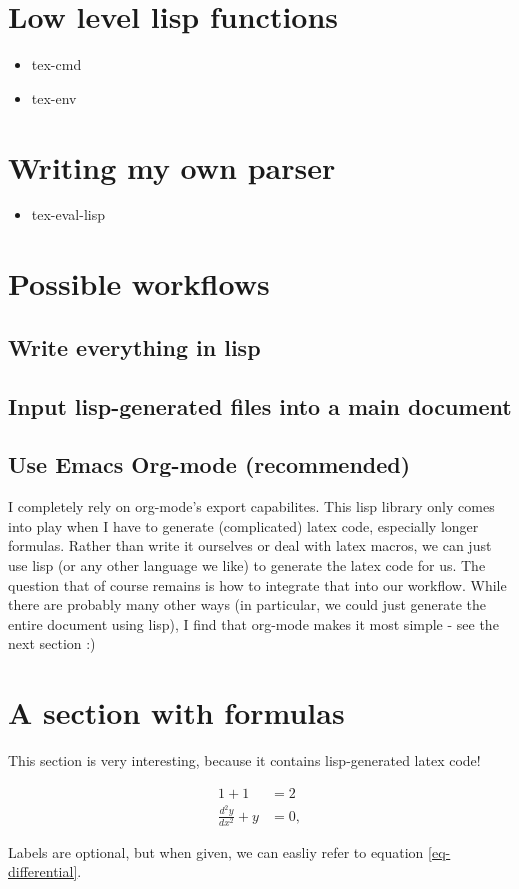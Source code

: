 \documentclass[11pt]{article}
\begin{document}
\section{Low level lisp functions}
\label{sec:orgc5113ad}
\begin{itemize}
\item tex-cmd
\item tex-env
\end{itemize}

\section{Writing my own parser}
\label{sec:org93dfc3d}
\begin{itemize}
\item tex-eval-lisp
\end{itemize}

\section{Possible workflows}
\label{sec:org003b3ed}
\subsection{Write everything in lisp}
\label{sec:org22d3ca8}
\subsection{Input lisp-generated files into a main document}
\label{sec:org717486b}
\subsection{Use Emacs Org-mode (recommended)}
\label{sec:org6638016}
I completely rely on org-mode's export capabilites. This lisp library only 
comes into play when I have to generate (complicated) latex code, especially 
longer formulas. Rather than write it ourselves or deal with latex macros,
we can just use lisp (or any other language we like) to generate the latex code 
for us. The question that of course remains is how to integrate that into our workflow. 
While there are probably many other ways (in particular, we could 
just generate the entire document using lisp), I find that org-mode makes it most 
simple - see the next section :)

\section{A section with formulas}
\label{sec:org919a12b}
This section is very interesting, because it contains lisp-generated latex code!

\begin{align}
\label{eq-simple}
1 + 1 &= 2 \\
\label{eq-differential}
\frac{d^{2} y}{d x^{2}} + y &= 0 
,
\end{align}

Labels are optional, but when given, we can easliy refer to equation \ref{eq-differential}.
\end{document}
